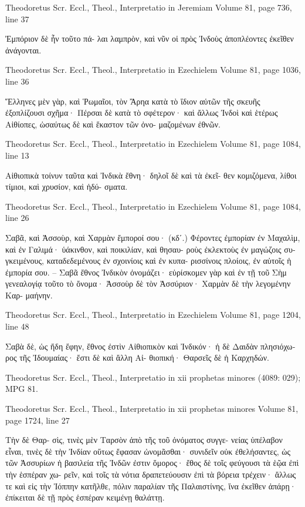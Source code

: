 \documentclass[12pt,letterpaper,twoside,final]{memoir}
\begin{document}
\begin{greek}
Theodoretus Scr. Eccl., Theol., Interpretatio in Jeremiam 
Volume 81, page 736, line 37

                          Ἐμπόριον δὲ ἦν τοῦτο πά-
λαι λαμπρὸν, καὶ νῦν οἱ πρὸς Ἰνδοὺς ἀποπλέοντες 
ἐκεῖθεν ἀνάγονται. 




Theodoretus Scr. Eccl., Theol., Interpretatio in Ezechielem 
Volume 81, page 1036, line 36

Ἕλληνες μὲν γὰρ, καὶ Ῥωμαῖοι, τὸν Ἄρηα κατὰ 
τὸ ἴδιον αὑτῶν τῆς σκευῆς ἐξοπλίζουσι σχῆμα· 
Πέρσαι δὲ κατὰ τὸ σφέτερον· καὶ ἄλλως Ἰνδοὶ καὶ 
ἑτέρως Αἰθίοπες, ὡσαύτως δὲ καὶ ἕκαστον τῶν ὀνο-
μαζομένων ἐθνῶν. 




Theodoretus Scr. Eccl., Theol., Interpretatio in Ezechielem 
Volume 81, page 1084, line 13

                                               Αἰθιοπικὰ 
τοίνυν ταῦτα καὶ Ἰνδικὰ ἔθνη· δηλοῖ δὲ καὶ τὰ ἐκεῖ-
θεν κομιζόμενα, λίθοι τίμιοι, καὶ χρυσίον, καὶ ἡδύ-
σματα. 



Theodoretus Scr. Eccl., Theol., Interpretatio in Ezechielem 
Volume 81, page 1084, line 26

Σαβᾶ, καὶ Ἀσσοὺρ, καὶ Χαρμὰν ἔμποροί σου· 
(κδʹ.) Φέροντες ἐμπορίαν ἐν Μαχαλὶμ, καὶ ἐν 
Γαλιμά· ὑάκινθον, καὶ ποικιλίαν, καὶ θησαυ-
ροὺς ἐκλεκτοὺς ἐν μαγώζοις συγκειμένους, 
καταδεδεμένους ἐν σχοινίοις καὶ ἐν κυπα-
ρισσίνοις πλοίοις, ἐν αὐτοῖς ἡ ἐμπορία σου.  –  
Σαβᾶ ἔθνος Ἰνδικὸν ὀνομάζει· εὑρίσκομεν γὰρ καὶ 
ἐν τῇ τοῦ Σὴμ γενεαλογίᾳ τοῦτο τὸ ὄνομα· Ἀσσοὺρ 
δὲ τὸν Ἀσσύριον· Χαρμὰν δὲ τὴν λεγομένην Καρ-
μαήνην. 



Theodoretus Scr. Eccl., Theol., Interpretatio in Ezechielem 
Volume 81, page 1204, line 48

                        Σαβὰ δὲ, ὡς ἤδη ἔφην, 
ἔθνος ἐστὶν Αἰθιοπικὸν καὶ Ἰνδικόν· ἡ δὲ Δαιδὰν 
πλησιόχωρος τῆς Ἰδουμαίας· ἔστι δὲ καὶ ἄλλη Αἰ-
θιοπική· Θαρσεῖς δὲ ἡ Καρχηδών. 




Theodoretus Scr. Eccl., Theol., Interpretatio in xii prophetas minores (4089: 029); MPG 81.


Theodoretus Scr. Eccl., Theol., Interpretatio in xii prophetas minores 
Volume 81, page 1724, line 27

                                            Τὴν δὲ Θαρ-
σὶς, τινὲς μὲν Ταρσὸν ἀπὸ τῆς τοῦ ὀνόματος συγγε-
νείας ὑπέλαβον εἶναι, τινὲς δὲ τὴν Ἰνδίαν οὕτως 
ἔφασαν ὠνομᾶσθαι· συνιδεῖν οὐκ ἐθελήσαντες, ὡς 
τῶν Ἀσσυρίων ἡ βασιλεία τῆς Ἰνδῶν ἐστιν ὅμορος· 
ἔθος δὲ τοῖς φεύγουσι τὰ ἑῷα ἐπὶ τὴν ἑσπέραν χω-
ρεῖν, καὶ τοῖς τὰ νότια δραπετεύουσιν ἐπὶ τὰ βόρεια 
τρέχειν· ἄλλως τε καὶ εἰς τὴν Ἰόππην κατῆλθε, 
πόλιν παραλίαν τῆς Παλαιστίνης, ἵνα ἐκεῖθεν ἀπάρῃ· 
ἐπίκειται δὲ τῇ πρὸς ἑσπέραν κειμένῃ θαλάττῃ. 




\end{greek}
\end{document}
